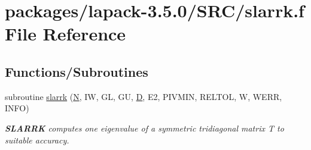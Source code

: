 \hypertarget{slarrk_8f}{}\section{packages/lapack-\/3.5.0/\+S\+R\+C/slarrk.f File Reference}
\label{slarrk_8f}
\subsection*{Functions/\+Subroutines}
\begin{DoxyCompactItemize}
\item 
subroutine \hyperlink{group__auxOTHERauxiliary_gac34836aa49da0ba1ef397af5a5590e22}{slarrk} (\hyperlink{polmisc_8c_a0240ac851181b84ac374872dc5434ee4}{N}, I\+W, G\+L, G\+U, \hyperlink{odrpack_8h_a7dae6ea403d00f3687f24a874e67d139}{D}, E2, P\+I\+V\+M\+I\+N, R\+E\+L\+T\+O\+L, W, W\+E\+R\+R, I\+N\+F\+O)
\begin{DoxyCompactList}\small\item\em {\bfseries S\+L\+A\+R\+R\+K} computes one eigenvalue of a symmetric tridiagonal matrix T to suitable accuracy. \end{DoxyCompactList}\end{DoxyCompactItemize}
